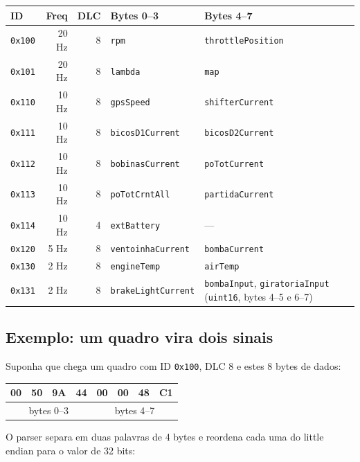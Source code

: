 \documentclass[11pt,a4paper]{article}
\begin{document}
\begin{center}
\small
\begin{tabularx}{\textwidth}{lrrXX}
\toprule
\textbf{ID} & \textbf{Freq} & \textbf{DLC} & \textbf{Bytes 0--3} & \textbf{Bytes 4--7} \\
\midrule
\texttt{0x100} & 20 Hz & 8 & \texttt{rpm} & \texttt{throttlePosition} \\
\texttt{0x101} & 20 Hz & 8 & \texttt{lambda} & \texttt{map} \\
\texttt{0x110} & 10 Hz & 8 & \texttt{gpsSpeed} & \texttt{shifterCurrent} \\
\texttt{0x111} & 10 Hz & 8 & \texttt{bicosD1Current} & \texttt{bicosD2Current} \\
\texttt{0x112} & 10 Hz & 8 & \texttt{bobinasCurrent} & \texttt{poTotCurrent} \\
\texttt{0x113} & 10 Hz & 8 & \texttt{poTotCrntAll} & \texttt{partidaCurrent} \\
\texttt{0x114} & 10 Hz & 4 & \texttt{extBattery} & --- \\
\texttt{0x120} & 5 Hz & 8 & \texttt{ventoinhaCurrent} & \texttt{bombaCurrent} \\
\texttt{0x130} & 2 Hz & 8 & \texttt{engineTemp} & \texttt{airTemp} \\
\texttt{0x131} & 2 Hz & 8 & \texttt{brakeLightCurrent} & \texttt{bombaInput}, \texttt{giratoriaInput} (\texttt{uint16}, bytes 4--5 e 6--7) \\
\bottomrule
\end{tabularx}
\end{center}

\subsection{Exemplo: um quadro vira dois sinais}

Suponha que chega um quadro com ID \texttt{0x100}, DLC 8 e estes 8 bytes de dados:

\begin{center}
\ttfamily
\begin{tabular}{|c|c|c|c|c|c|c|c|}
\hline
00 & 50 & 9A & 44 & 00 & 00 & 48 & C1 \\
\hline
\multicolumn{4}{|c|}{bytes 0--3} & \multicolumn{4}{c|}{bytes 4--7} \\
\hline
\end{tabular}
\end{center}

O parser separa em duas palavras de 4 bytes e reordena cada uma do little endian para o valor de 32 bits:
\end{document}

